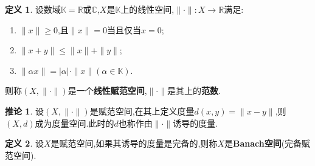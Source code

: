\documentclass{ctexart}
\theoremstyle{definition}
\newtheorem{definition}{定义}
\newtheorem{corollary}{推论}
\theoremstyle{remark}
\begin{document}
	\begin{definition}
		设数域$\mathbb{K}=\mathbb{R}\mbox{或}\mathbb{C}$,$X$是$\mathbb{K}$上的线性空间,$\|\cdot\|:X\to\mathbb{R}$满足:
		\begin{enumerate}
			\item $\|x\|\ge 0$,且$\|x\|=0$当且仅当$x=0$;
			\item $\|x+y\|\le\|x\|+\|y\|$;
			\item $\|\alpha x\|=|\alpha|\cdot\|x\|(\alpha\in\mathbb{K})$.
		\end{enumerate}
		则称$(X,\|\cdot\|)$是一个\textbf{线性赋范空间},$\|\cdot\|$是其上的\textbf{范数}.
	\end{definition}
	\begin{corollary}
		设$(X,\|\cdot\|)$是赋范空间,在其上定义度量$d(x,y)=\|x-y\|$,则$(X,d)$成为度量空间.此时的$d$也称作由$\|\cdot\|$诱导的度量.
	\end{corollary}
	\begin{definition}
		设$X$是赋范空间,如果其诱导的度量是完备的,则称$X$是\textbf{Banach空间}(完备赋范空间).
	\end{definition}
	
\end{document}
